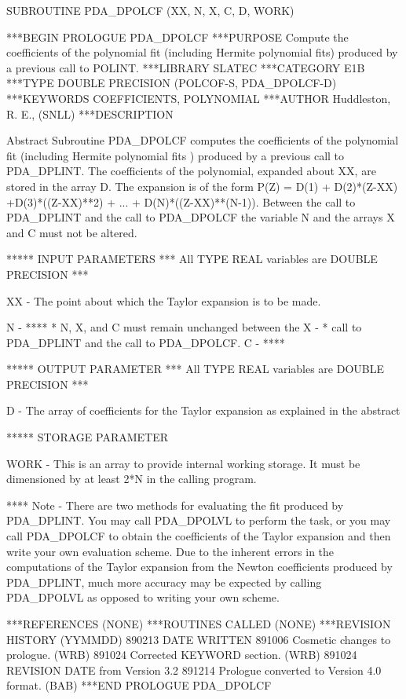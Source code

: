 \documentclass[11pt,twoside,nolof]{starlink}
\begin{document}
\begin{terminalv}
      SUBROUTINE PDA_DPOLCF (XX, N, X, C, D, WORK)


***BEGIN PROLOGUE  PDA_DPOLCF
***PURPOSE  Compute the coefficients of the polynomial fit (including
            Hermite polynomial fits) produced by a previous call to
            POLINT.
***LIBRARY   SLATEC
***CATEGORY  E1B
***TYPE      DOUBLE PRECISION (POLCOF-S, PDA_DPOLCF-D)
***KEYWORDS  COEFFICIENTS, POLYNOMIAL
***AUTHOR  Huddleston, R. E., (SNLL)
***DESCRIPTION

     Abstract
        Subroutine PDA_DPOLCF computes the coefficients of the polynomial
     fit (including Hermite polynomial fits ) produced by a previous
     call to PDA_DPLINT.  The coefficients of the polynomial, expanded
     about XX, are stored in the array D. The expansion is of the form
     P(Z) = D(1) + D(2)*(Z-XX) +D(3)*((Z-XX)**2) + ... +
                                                  D(N)*((Z-XX)**(N-1)).
     Between the call to PDA_DPLINT and the call to PDA_DPOLCF the variable N
     and the arrays X and C must not be altered.

     *****  INPUT PARAMETERS
      *** All TYPE REAL variables are DOUBLE PRECISION ***

     XX   - The point about which the Taylor expansion is to be made.

     N    - ****
            *     N, X, and C must remain unchanged between the
     X    - *     call to PDA_DPLINT and the call to PDA_DPOLCF.
     C    - ****

     *****  OUTPUT PARAMETER
      *** All TYPE REAL variables are DOUBLE PRECISION ***

     D    - The array of coefficients for the Taylor expansion as
            explained in the abstract

     *****  STORAGE PARAMETER

     WORK - This is an array to provide internal working storage. It
            must be dimensioned by at least 2*N in the calling program.


     **** Note - There are two methods for evaluating the fit produced
     by PDA_DPLINT. You may call PDA_DPOLVL to perform the task, or you may
     call PDA_DPOLCF to obtain the coefficients of the Taylor expansion and
     then write your own evaluation scheme. Due to the inherent errors
     in the computations of the Taylor expansion from the Newton
     coefficients produced by PDA_DPLINT, much more accuracy may be
     expected by calling PDA_DPOLVL as opposed to writing your own scheme.

***REFERENCES  (NONE)
***ROUTINES CALLED  (NONE)
***REVISION HISTORY  (YYMMDD)
   890213  DATE WRITTEN
   891006  Cosmetic changes to prologue.  (WRB)
   891024  Corrected KEYWORD section.  (WRB)
   891024  REVISION DATE from Version 3.2
   891214  Prologue converted to Version 4.0 format.  (BAB)
***END PROLOGUE  PDA_DPOLCF
\end{terminalv}
\end{document}
